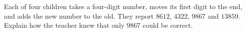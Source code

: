 Each of four children takes a four-digit number, moves its first digit to the end, and adds the new number to the old. They report $8612$, $4322$, $9867$ and $13859$. Explain how the teacher knew that only $9867$ could be correct.
